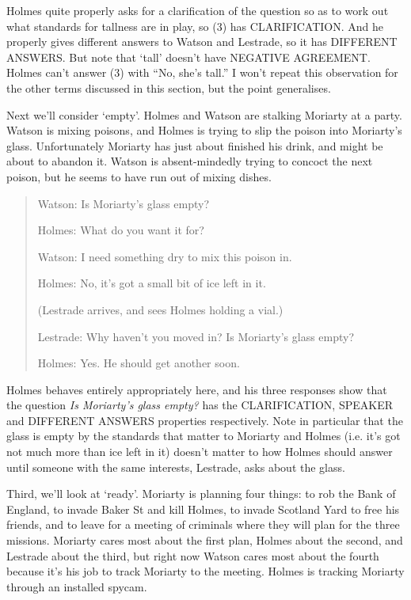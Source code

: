 \noindent Holmes quite properly asks for a clarification of the question so as to work out what standards for tallness are in play, so (3) has CLARIFICATION. And he properly gives different answers to Watson and Lestrade, so it has DIFFERENT ANSWERS. But note that `tall' doesn't have NEGATIVE AGREEMENT. Holmes can't answer (3) with ``No, she's tall.'' I won't repeat this observation for the other terms discussed in this section, but the point generalises.

Next we'll consider `empty'. Holmes and Watson are stalking Moriarty at a party. Watson is mixing poisons, and Holmes is trying to slip the poison into Moriarty's glass. Unfortunately Moriarty has just about finished his drink, and might be about to abandon it. Watson is absent-mindedly trying to concoct the next poison, but he seems to have run out of mixing dishes.

\begin{quote}
Watson: Is Moriarty's glass empty?

Holmes: What do you want it for?

Watson: I need something dry to mix this poison in.

Holmes: No, it's got a small bit of ice left in it.

(Lestrade arrives, and sees Holmes holding a vial.)

Lestrade: Why haven't you moved in? Is Moriarty's glass empty?

Holmes: Yes. He should get another soon.
\end{quote}

\noindent Holmes behaves entirely appropriately here, and his three responses show that the question \textit{Is Moriarty's glass empty?} has the CLARIFICATION, SPEAKER and DIFFERENT ANSWERS properties respectively. Note in particular that the glass is empty by the standards that matter to Moriarty and Holmes (i.e. it's got not much more than ice left in it) doesn't matter to how Holmes should answer until someone with the same interests, Lestrade, asks about the glass.

Third, we'll look at `ready'. Moriarty is planning four things: to rob the Bank of England, to invade Baker St and kill Holmes, to invade Scotland Yard to free his friends, and to leave for a meeting of criminals where they will plan for the three missions. Moriarty cares most about the first plan, Holmes about the second, and Lestrade about the third, but right now Watson cares most about the fourth because it's his job to track Moriarty to the meeting. Holmes is tracking Moriarty through an installed spycam.

